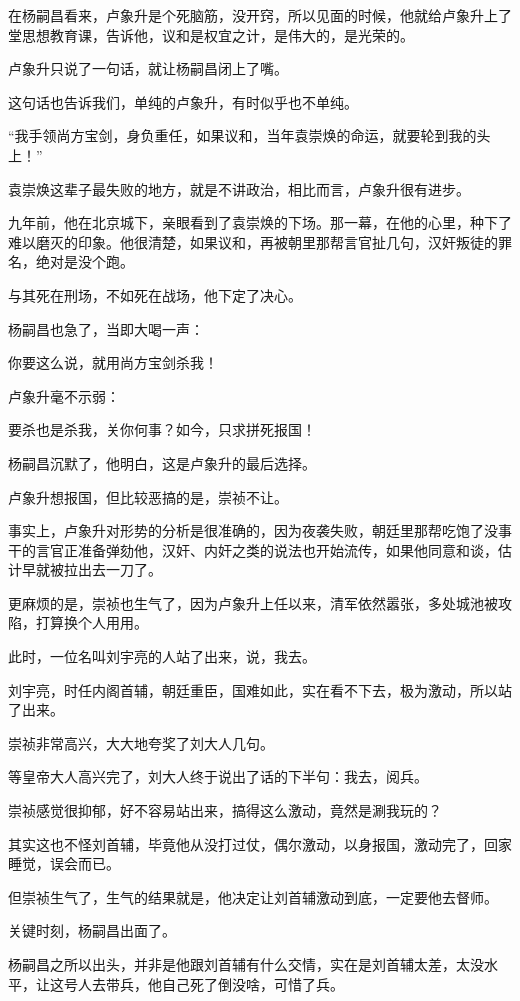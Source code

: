 \begin{multicols}{\theparacolNo}
		在杨嗣昌看来，卢象升是个死脑筋，没开窍，所以见面的时候，他就给卢象升上了堂思想教育课，告诉他，议和是权宜之计，是伟大的，是光荣的。

		卢象升只说了一句话，就让杨嗣昌闭上了嘴。

		这句话也告诉我们，单纯的卢象升，有时似乎也不单纯。

		“我手领尚方宝剑，身负重任，如果议和，当年袁崇焕的命运，就要轮到我的头上！”

		袁崇焕这辈子最失败的地方，就是不讲政治，相比而言，卢象升很有进步。

		九年前，他在北京城下，亲眼看到了袁崇焕的下场。那一幕，在他的心里，种下了难以磨灭的印象。他很清楚，如果议和，再被朝里那帮言官扯几句，汉奸叛徒的罪名，绝对是没个跑。

		与其死在刑场，不如死在战场，他下定了决心。

		杨嗣昌也急了，当即大喝一声：

		你要这么说，就用尚方宝剑杀我！

		卢象升毫不示弱：

		要杀也是杀我，关你何事？如今，只求拼死报国！

		杨嗣昌沉默了，他明白，这是卢象升的最后选择。

		卢象升想报国，但比较恶搞的是，崇祯不让。

		事实上，卢象升对形势的分析是很准确的，因为夜袭失败，朝廷里那帮吃饱了没事干的言官正准备弹劾他，汉奸、内奸之类的说法也开始流传，如果他同意和谈，估计早就被拉出去一刀了。

		更麻烦的是，崇祯也生气了，因为卢象升上任以来，清军依然嚣张，多处城池被攻陷，打算换个人用用。

		此时，一位名叫刘宇亮的人站了出来，说，我去。

		刘宇亮，时任内阁首辅，朝廷重臣，国难如此，实在看不下去，极为激动，所以站了出来。

		崇祯非常高兴，大大地夸奖了刘大人几句。

		等皇帝大人高兴完了，刘大人终于说出了话的下半句：我去，阅兵。

		崇祯感觉很抑郁，好不容易站出来，搞得这么激动，竟然是涮我玩的？

		其实这也不怪刘首辅，毕竟他从没打过仗，偶尔激动，以身报国，激动完了，回家睡觉，误会而已。

		但崇祯生气了，生气的结果就是，他决定让刘首辅激动到底，一定要他去督师。

		关键时刻，杨嗣昌出面了。

		杨嗣昌之所以出头，并非是他跟刘首辅有什么交情，实在是刘首辅太差，太没水平，让这号人去带兵，他自己死了倒没啥，可惜了兵。


\end{multicols}
